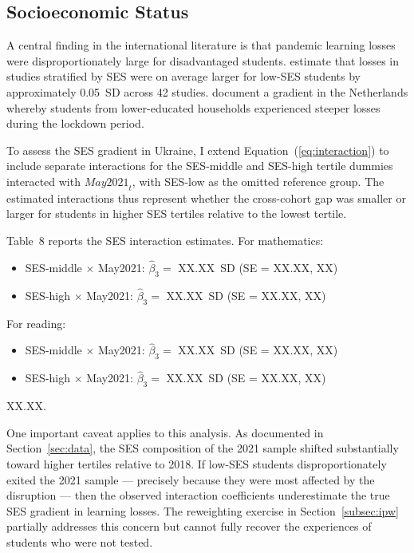 \subsection{Socioeconomic Status}
\label{subsec:ses}

A central finding in the international literature is that pandemic
learning losses were disproportionately large for disadvantaged students.
\citet{betthaeuser2023systematic} estimate that losses in studies
stratified by SES were on average larger for low-SES students by
approximately 0.05~SD across 42 studies. \citet{engzell2021learning}
document a gradient in the Netherlands whereby students from lower-educated
households experienced steeper losses during the lockdown period.

To assess the SES gradient in Ukraine, I extend Equation~(\ref{eq:interaction})
to include separate interactions for the SES-middle and SES-high tertile
dummies interacted with $\mathit{May2021}_t$, with SES-low as the omitted
reference group. The estimated interactions thus represent whether the
cross-cohort gap was smaller or larger for students in higher SES tertiles
relative to the lowest tertile.

Table~8 reports the SES interaction estimates. For mathematics:
\begin{itemize}
  \item SES-middle $\times$ May2021: $\hat{\beta}_3 =$ XX.XX~SD
        (SE = XX.XX, XX) %
  \item SES-high $\times$ May2021: $\hat{\beta}_3 =$ XX.XX~SD
        (SE = XX.XX, XX) %
\end{itemize}
For reading:
\begin{itemize}
  \item SES-middle $\times$ May2021: $\hat{\beta}_3 =$ XX.XX~SD
        (SE = XX.XX, XX) %
  \item SES-high $\times$ May2021: $\hat{\beta}_3 =$ XX.XX~SD
        (SE = XX.XX, XX) %
\end{itemize}
XX.XX. %

One important caveat applies to this analysis. As documented in
Section~\ref{sec:data}, the SES composition of the 2021 sample shifted
substantially toward higher tertiles relative to 2018. If low-SES
students disproportionately exited the 2021 sample --- precisely because
they were most affected by the disruption --- then the observed interaction
coefficients underestimate the true SES gradient in learning losses.
The reweighting exercise in Section~\ref{subsec:ipw} partially addresses
this concern but cannot fully recover the experiences of students who
were not tested.

